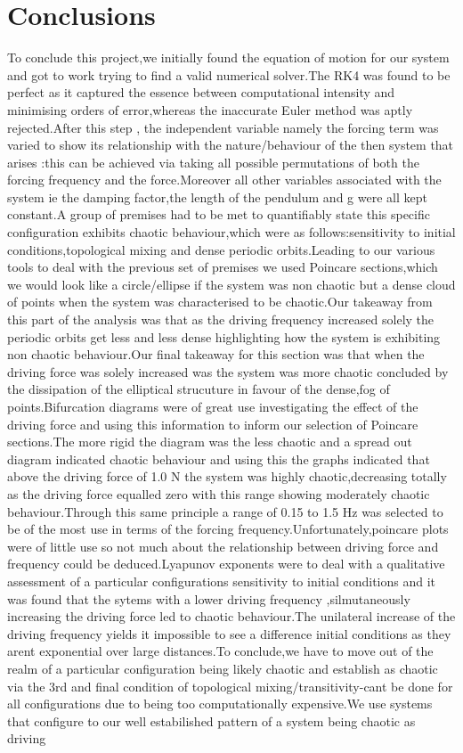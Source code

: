 \documentclass[11pt]{article} %
\begin{document}
\section{Conclusions}
To conclude this project,we initially found the equation of motion for our system and got to work trying to find a valid numerical solver.The RK4 was found to be perfect as it captured the essence between computational intensity and minimising orders of error,whereas the inaccurate Euler method was aptly rejected.After this step , the independent variable namely the forcing term was varied  to show its relationship with the nature/behaviour of the then system that arises :this can be achieved via taking all possible permutations of both the forcing frequency and the force.Moreover all other variables associated with the system ie the damping factor,the length of the pendulum and g were all kept constant.A group of premises had to be met to quantifiably state this specific configuration exhibits chaotic behaviour,which were as follows:sensitivity to initial conditions,topological mixing and dense periodic orbits.Leading to our various tools to deal with the previous set of premises we used Poincare sections,which we would look like a circle/ellipse if the system was non chaotic but a dense cloud of points when the system was characterised to be chaotic.Our takeaway from this part of the analysis was that as the driving frequency increased solely the periodic orbits get less and less dense highlighting how the system is exhibiting non chaotic behaviour.Our final takeaway for this section was that when the driving force was solely increased was the system was more chaotic concluded by the dissipation of the elliptical strucuture in favour of the dense,fog of points.Bifurcation diagrams were of great use investigating the effect of the driving force  and using this information to inform our selection of Poincare sections.The more rigid the diagram was the less chaotic and a spread out diagram indicated chaotic behaviour and using this the graphs indicated that above the driving force of 1.0 N the system was highly chaotic,decreasing totally as the driving force equalled zero with this range showing moderately chaotic behaviour.Through this same principle a range of 0.15 to 1.5 Hz was selected to be of the most use in terms of the forcing frequency.Unfortunately,poincare plots were of little use so not much about the relationship between driving force and frequency could be deduced.Lyapunov exponents were to deal with a qualitative assessment of a particular configurations sensitivity to initial conditions and it was found that the sytems with a lower driving frequency ,silmutaneously increasing the driving force led to chaotic behaviour.The unilateral increase of the driving frequency yields it impossible to see a difference initial conditions as they arent exponential over large distances.To conclude,we have to move out of the realm of a particular configuration being likely chaotic and establish as chaotic via the 3rd and final condition of topological mixing/transitivity-cant be done for all configurations due to being too computationally expensive.We use systems that configure to our well estabilished pattern of a system being chaotic as driving 
\end{document}
